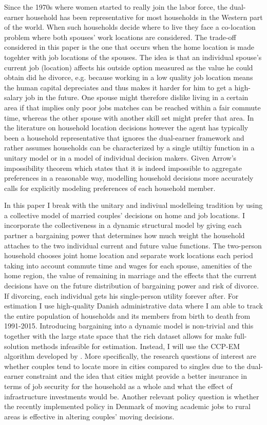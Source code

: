 Since the 1970s where women started to really join the labor force, the dual-earner household has been representative for most households in the Western part of the world. When such households decide where to live they face a co-location problem where both spouses' work locations are considered. The trade-off considered in this paper is the one that occurs when the home location is made togehter with job locations of the spouses. The idea is that an individual spouse's current job (location) affects his outside option measured as the value he could obtain did he divorce, e.g. because working in a low quality job location means the human capital depreciates and thus makes it harder for him to get a high-salary job in the future. One spouse might therefore dislike living in a certain area if that implies only poor jobs matches can be reached within a fair commute time, whereas the other spouse with another skill set might prefer that area. In the literature on household location decisions however the agent has typically been a household representative that ignores the dual-earner framework and rather assumes households can be characterized by a single utiltiy function in a unitary model or in a model of individual decision makers. Given Arrow's impossibility theorem which states that it is indeed impossible to aggregate preferences in a reasonable way, modelling household decisions more accurately calls for explicitly modeling preferences of each household member. 

In this paper I break with the unitary and indiviual modelleing tradition by using a collective model of married couples' decisions on home and job locations. I incorporate the collectiveness in a dynamic structural model by giving each partner a bargaining power that determines how much weight the household attaches to the two individual current and future value functions. The two-person household chooses joint home location and separate work locations each period taking into account commute time and wages for each spouse, amenities of the home region, the value of remaining in marriage and the effects that the current decisions have on the future distribution of bargaining power and risk of divorce. If divorcing, each individual gets his single-person utility forever after. For estimation I use high-quality Danish administrative data where I am able to track the entire population of households and its members from birth to death from 1991-2015. Introducing bargaining into a dynamic model is non-trivial and this together with the large state space that the rich dataset allows for make full-solution methods infeasible for estimation. Instead, I will use the CCP-EM algorithm developed by \cite{ArcidiaconoMiller2011}. More specifically, the research questions of interest are whether couples tend to locate more in cities compared to singles due to the dual-earner constraint and the idea that cities might provide a better insurance in terms of job security for the household as a whole and what the effect of infrastructure investments would be. Another relevant policy question is whether the recently implemented policy in Denmark of moving academic jobs to rural areas is effective in altering couples' moving decisions.


